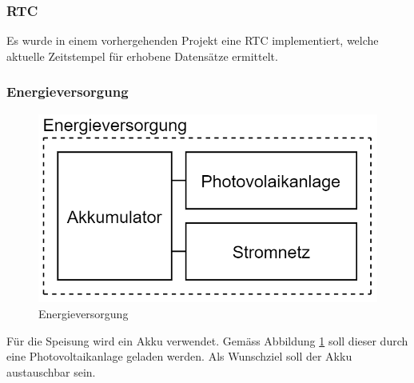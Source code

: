 \subsubsection{RTC}
Es wurde in einem vorhergehenden Projekt eine RTC implementiert, welche aktuelle Zeitstempel für erhobene Datensätze ermittelt.\\
\newpage
\subsubsection{Energieversorgung}
\begin{figure}[h]
\centering
\includegraphics[scale=0.6]{graphics/Energieversorgung.PNG}
\caption{Energieversorgung}
\label{fig:Energieversorgung}
\end{figure}

Für die Speisung wird ein Akku verwendet. Gemäss Abbildung \ref{fig:Energieversorgung} soll dieser durch eine Photovoltaikanlage geladen werden. Als Wunschziel soll der Akku austauschbar sein.\\